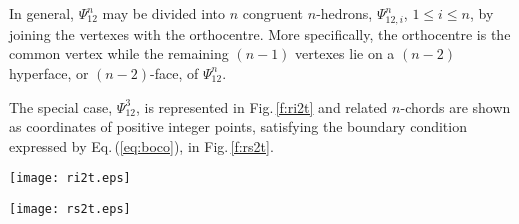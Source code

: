 \documentclass[12pt,a4paper]{article}
\begin{document}
In general, $\Psi_{12}^n$ may be divided into $n$ congruent $n$-hedrons,
$\Psi_{12,i}^n$, $1\le i\le n$, by joining the vertexes with the orthocentre.
More specifically, the orthocentre is the common vertex while the remaining
$(n-1)$ vertexes lie on a $(n-2)$ hyperface, or $(n-2)$-face, of
$\Psi_{12}^n$.

The special case,
$\Psi_{12}^3$, is
represented in Fig.\,\ref{f:ri2t} and related $n$-chords are shown as
coordinates of positive integer points, satisfying the boundary condition
expressed by Eq.\,(\ref{eq:boco}), in Fig.\,\ref{f:rs2t}.
%
\begin{figure*}[t]
\begin{center}      
\texttt{[image: ri2t.eps]}                      
\caption[rbfa]{The special case, $n=3$, where the regular inclined
$n$-hedron reduces to a regular triangle and congruent
$n$-hedrons to isosceles triangles with adjacent equal sides.
The common vertex of isosceles triangles coincides with the orthocentre of the
regular triangle.}
\label{f:ri2t}
\end{center}       
\end{figure*}                                                                     
%                      
%
\begin{figure*}[t]
\begin{center}      
\texttt{[image: rs2t.eps]}                      
\caption[rbfa]{Representation of distinct $n$-chords of cardinality, $n$,
as positive integer coordinates of points in an
Euclidean $n$-space, lying within a regular inclined $n$-hedron via
Eq.\,(\ref{eq:boco}), in the special case, $n=3$.   The total number of
distinct 3-chords is $N_{\rm C}(3)=55$.  In representing coordinates,
brackets have been omitted to save space and ten has been replaced by zero to
save aesthetics.}
\label{f:rs2t}
\end{center}       
\end{figure*}                                                                     
%                      
\end{document}
